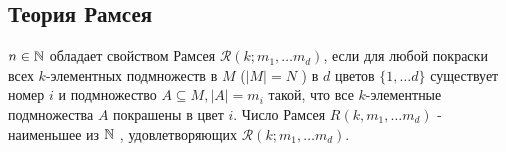 \documentclass[12pt]{article}
\begin{document}
\subsection{Теория Рамсея}
\begin{defn}
    $n \in  \mathbb{N}$ обладает свойством Рамсея $\mathcal{R}(k; m_1, \ldots m_d)$, если для любой покраски всех $k$-элементных подмножеств в $M$ ($|M| = N$ ) в $d$ цветов $\{1, \ldots d\}$ существует номер $i$ и подмножество $A \subseteq M, |A| = m_i$ такой, что все $k$-элементные подмножества $A$ покрашены в цвет $i$.
    Число Рамсея $R(k, m_1, \ldots  m_d)$ - наименьшее из $\mathbb{N}$ , удовлетворяющих $\mathcal{R}(k; m_1, \ldots m_d).$
\end{defn}
\end{document}
